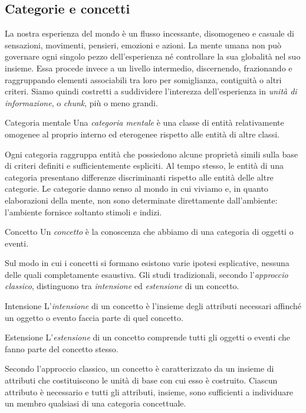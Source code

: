 \documentclass[a4paper]{article}
\begin{document}
\subsection{Categorie e concetti}
La nostra esperienza del mondo è un flusso incessante, disomogeneo e casuale di sensazioni, movimenti, pensieri, emozioni e azioni. La mente umana non può governare ogni singolo pezzo dell'esperienza né controllare la sua globalità nel suo insieme. Essa procede invece a un livello intermedio, discernendo, frazionando e raggruppando elementi associabili tra loro per somiglianza, contiguità o altri criteri.
Siamo quindi costretti a suddividere l'interezza dell'esperienza in \emph{unità di informazione}, o \emph{chunk}, più o meno grandi.
\begin{snippetdefinition}{Categoria mentale}
    Una \emph{categoria mentale} è una classe di entità relativamente omogenee al proprio interno ed eterogenee rispetto alle entità di altre classi.
\end{snippetdefinition}
Ogni categoria raggruppa entità che possiedono alcune proprietà simili sulla base di criteri definiti e sufficientemente espliciti. Al tempo stesso, le entità di una categoria presentano differenze discriminanti rispetto alle entità delle altre categorie.
Le categorie danno senso al mondo in cui viviamo e, in quanto elaborazioni della mente, non sono determinate direttamente dall'ambiente: l'ambiente fornisce soltanto stimoli e indizi.
\begin{snippetdefinition}{Concetto}
    Un \emph{concetto} è la conoscenza che abbiamo di una categoria di oggetti o eventi.
\end{snippetdefinition}
Sul modo in cui i concetti si formano esistono varie ipotesi esplicative, nessuna delle quali completamente esaustiva.
Gli studi tradizionali, secondo l'\emph{approccio classico}, distinguono tra \emph{intensione} ed \emph{estensione} di un concetto.
\begin{snippetdefinition}{Intensione}
    L'\emph{intensione} di un concetto è l'insieme degli attributi necessari affinché un oggetto o evento faccia parte di quel concetto.
\end{snippetdefinition}
\begin{snippetdefinition}{Estensione}
    L'\emph{estensione} di un concetto comprende tutti gli oggetti o eventi che fanno parte del concetto stesso.
\end{snippetdefinition}
Secondo l'approccio classico, un concetto è caratterizzato da un insieme di attributi che costituiscono le unità di base con cui esso è costruito. Ciascun attributo è necessario e tutti gli attributi, insieme, sono sufficienti a individuare un membro qualsiasi di una categoria concettuale.
\end{document}
